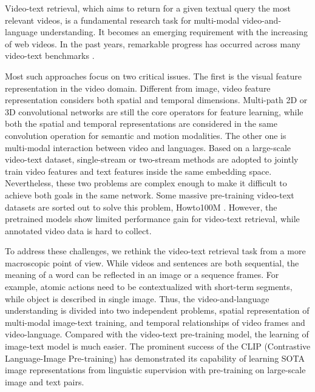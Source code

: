 \documentclass[final]{cvpr}
\begin{document}
Video-text retrieval, which aims to return for a given textual query the most relevant videos, is a fundamental research task for multi-modal video-and-language understanding. It becomes an emerging requirement with the increasing of web videos. In the past years, remarkable progress \cite{yu2018joint, zhu2020actbert, lei2021less, liu2019use, gabeur2020multi, dzabraev2021mdmmt, mithun2018learning, zhang2018cross, liu2021hit, dong2019dual, TimeSformer, arnab2021vivit} has occurred across many video-text benchmarks \cite{caba2015activitynet, xu2016msr, wang2019vatex, chen2011collecting, Rohrbach2015lsmdc, Hendricks2017DiDeMo}. 

Most such approaches focus on two critical issues. The first is the visual feature representation in the video domain. Different from image, video feature representation considers both spatial and temporal dimensions. Multi-path 2D or 3D convolutional networks \cite{zhang2018s3d,feichtenhofer2019slowfast,wang2019hallucinating} are still the core operators for feature learning, while both the spatial and temporal representations are considered in the same convolution operation for semantic and motion modalities. The other one is multi-modal interaction between video and languages. Based on a large-scale video-text dataset, single-stream or two-stream methods \cite{zhu2020actbert, lei2021less, bain2021frozen, dzabraev2021mdmmt, zhang2018cross, dong2019dual} are adopted to jointly train video features and text features inside the same embedding space. Nevertheless, these two problems are complex enough to make it difficult to achieve both goals in the same network. Some massive pre-training video-text datasets are sorted out to solve this problem, \eg Howto100M \cite{miech2019howto100m}. However, the pretrained models show limited performance gain for video-text retrieval, while annotated video data is hard to collect. 



To address these challenges, we rethink the video-text retrieval task from a more macroscopic point of view. While videos and sentences are both sequential, the meaning of a word can be reflected in an image or a sequence frames. For example, atomic actions need to be contextualized with short-term segments, while object is described in single image. Thus, the video-and-language understanding is divided into two independent problems, spatial representation of multi-modal image-text training, and temporal relationships of video frames and video-language. Compared with the video-text pre-training model, the learning of image-text model is much easier. The prominent success of the CLIP \cite{radford2021learning} (Contrastive Language-Image Pre-training) has demonstrated its capability of learning SOTA image representations from linguistic supervision with pre-training on large-scale image and text pairs. 
\end{document}
